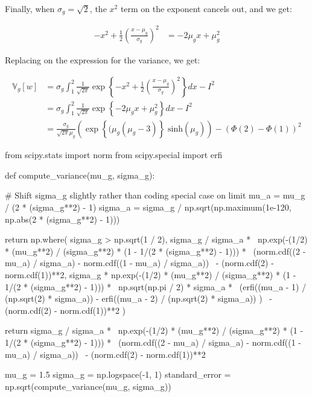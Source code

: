 Finally, when \(\sigma_g = \sqrt{2}\), the \(x^{2}\) term on the exponent
cancels out, and we get:

\begin{align*}
-x^{2} + \frac{1}{2} \left(\frac{x - \mu_g}{\sigma_g}\right)^{2} &= -2 \mu_g x + \mu_g^{2}
\end{align*}

Replacing on the expression for the variance, we get:

\begin{align*}
\mathbb{V}_g[w] &= \sigma_g \int_{1}^{2} \frac{1}{\sqrt{2 \pi}} \exp \left\{ -x^{2} +\frac{1}{2} \left(\frac{x - \mu_g}{\sigma_g}\right)^{2} \right\} dx - I^{2} \\
&= \sigma_g \int_{1}^{2} \frac{1}{\sqrt{2 \pi}} \exp \left\{ -2 \mu_g x + \mu_g^{2} \right\} dx - I^{2} \\
&= \frac{\sigma_g }{\sqrt{2 \pi} \mu_g} \left( \exp \left\{ (\mu_g (\mu_g - 3) \right\} \; \text{sinh} (\mu_g) \right) - \left( \Phi(2) - \Phi(1) \right)^{2}
\end{align*}

\begin{python}
from scipy.stats import norm
from scipy.special import erfi

def compute_variance(mu_g, sigma_g):
    
    # Shift sigma_g slightly rather than coding special case on limit
    mu_a = mu_g / (2 * (sigma_g**2) - 1)
    sigma_a = sigma_g / np.sqrt(np.maximum(1e-120, np.abs(2 * (sigma_g**2) - 1)))
    
    return np.where(
        sigma_g > np.sqrt(1 / 2),
        sigma_g / sigma_a * \
            np.exp(-(1/2) * (mu_g**2) / (sigma_g**2) * (1 - 1/(2 * (sigma_g**2) - 1))) * \
            (norm.cdf((2 - mu_a) / sigma_a) - norm.cdf((1 - mu_a) / sigma_a)) \
            - (norm.cdf(2) - norm.cdf(1))**2,
        sigma_g * np.exp(-(1/2) * (mu_g**2) / (sigma_g**2) * (1 - 1/(2 * (sigma_g**2) - 1))) * \
            np.sqrt(np.pi / 2) * sigma_a * \
                (erfi((mu_a - 1) / (np.sqrt(2) * sigma_a)) - erfi((mu_a - 2) / (np.sqrt(2) * sigma_a)) ) \
            - (norm.cdf(2) - norm.cdf(1))**2   
    )
    
    return sigma_g / sigma_a * \
        np.exp(-(1/2) * (mu_g**2) / (sigma_g**2) * (1 - 1/(2 * (sigma_g**2) - 1))) * \
        (norm.cdf((2 - mu_a) / sigma_a) - norm.cdf((1 - mu_a) / sigma_a)) \
        - (norm.cdf(2) - norm.cdf(1))**2 
\end{python}

\begin{python}
mu_g = 1.5
sigma_g = np.logspace(-1, 1)
standard_error = np.sqrt(compute_variance(mu_g, sigma_g))
\end{python}


